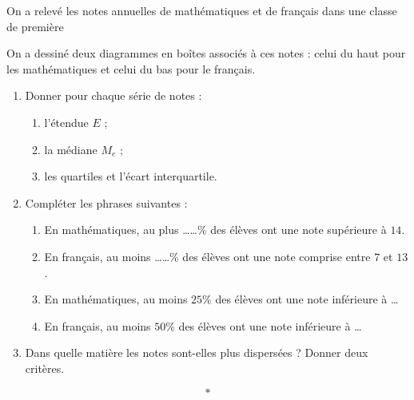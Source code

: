 \documentclass[10pt,openright,twoside,french]{book}
\begin{document}
\exo On a relevé les notes annuelles de mathématiques et de français dans une classe de première \par
On a dessiné deux diagrammes en boîtes associés à ces notes : celui du haut pour les mathématiques et celui du bas pour le français.

\begin{center}
\end{center}

\begin{enumerate}
    \item Donner pour chaque série de notes :
    \begin{enumerate}
        \item l'étendue $E$ ;
        \item la médiane $M_e$ ;
        \item les quartiles et l'écart interquartile.
    \end{enumerate}
    \item Compléter les phrases suivantes :
    \begin{enumerate}
        \item En mathématiques, au plus \ldots\ldots \% des élèves ont une note supérieure à $14$.
        \item En français, au moins \ldots\ldots \% des élèves ont une note comprise entre $7$ et $13$.
        \item En mathématiques, au moins $25\%$ des élèves ont une note inférieure à \ldots
        \item En français, au moins $50\%$ des élèves ont une note inférieure à \ldots
    \end{enumerate}
    \item Dans quelle matière les notes sont-elles plus dispersées ? Donner deux critères.
\end{enumerate}\[*\]
\end{document}
